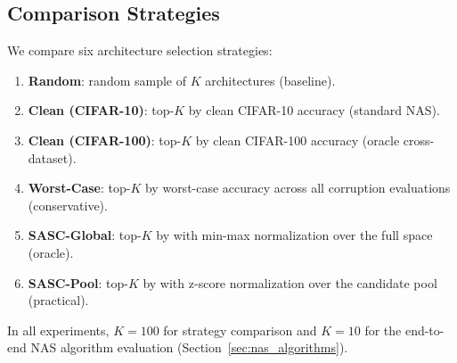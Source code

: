 \subsection{Comparison Strategies}
\label{sec:strategies}

We compare six architecture selection strategies:

\begin{enumerate}
    \item \textbf{Random}: random sample of $K$ architectures (baseline).
    \item \textbf{Clean (CIFAR-10)}: top-$K$ by clean CIFAR-10 accuracy (standard NAS).
    \item \textbf{Clean (CIFAR-100)}: top-$K$ by clean CIFAR-100 accuracy (oracle cross-dataset).
    \item \textbf{Worst-Case}: top-$K$ by worst-case accuracy across all corruption evaluations (conservative).
    \item \textbf{SASC-Global}: top-$K$ by \sasc with min-max normalization over the full space (oracle).
    \item \textbf{SASC-Pool}: top-$K$ by \sasc with z-score normalization over the candidate pool (practical).
\end{enumerate}

In all experiments, $K = 100$ for strategy comparison and $K = 10$ for the end-to-end NAS algorithm evaluation (Section~\ref{sec:nas_algorithms}).
